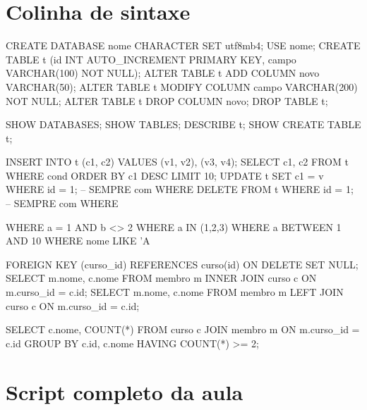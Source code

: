 \begin{apendicesenv}
\partapendices

\chapter{Colinha de sintaxe}
\label{ap:colinha}

\begin{sqlcode}[caption={Estrutura (DDL)}]
CREATE DATABASE nome CHARACTER SET utf8mb4;
USE nome;
CREATE TABLE t (id INT AUTO_INCREMENT PRIMARY KEY, campo VARCHAR(100) NOT NULL);
ALTER TABLE t ADD COLUMN novo VARCHAR(50);
ALTER TABLE t MODIFY COLUMN campo VARCHAR(200) NOT NULL;
ALTER TABLE t DROP COLUMN novo;
DROP TABLE t;
\end{sqlcode}

\begin{sqlcode}[caption={Inspeção}]
SHOW DATABASES;   SHOW TABLES;   DESCRIBE t;   SHOW CREATE TABLE t;
\end{sqlcode}

\begin{sqlcode}[caption={Dados (DML e DQL)}]
INSERT INTO t (c1, c2) VALUES (v1, v2), (v3, v4);
SELECT c1, c2 FROM t WHERE cond ORDER BY c1 DESC LIMIT 10;
UPDATE t SET c1 = v WHERE id = 1;      -- SEMPRE com WHERE
DELETE FROM t WHERE id = 1;            -- SEMPRE com WHERE
\end{sqlcode}

\begin{sqlcode}[caption={Filtros}]
WHERE a = 1 AND b <> 2
WHERE a IN (1,2,3)          WHERE a BETWEEN 1 AND 10
WHERE nome LIKE 'A%
\end{sqlcode}

\begin{sqlcode}[caption={Relacionamento}]
FOREIGN KEY (curso_id) REFERENCES curso(id) ON DELETE SET NULL;
SELECT m.nome, c.nome FROM membro m INNER JOIN curso c ON m.curso_id = c.id;
SELECT m.nome, c.nome FROM membro m LEFT  JOIN curso c ON m.curso_id = c.id;
\end{sqlcode}

\begin{sqlcode}[caption={Agregação}]
SELECT c.nome, COUNT(*) FROM curso c JOIN membro m ON m.curso_id = c.id
GROUP BY c.id, c.nome HAVING COUNT(*) >= 2;
\end{sqlcode}

\chapter{Script completo da aula}
\label{ap:script}


\end{apendicesenv}
